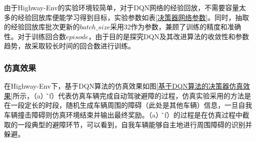 由于Highway-Env的实验环境较简单，对于DQN网络的经验回放，不需要容量太多的经验回放库便能学习得到目标，实验参数如表\ref{决策器网络参数}。同时，抽取的经验回放库批次更新的$batch\_size$采用32作为参数，兼顾了训练的精度和准确性。对于训练回合数$episode$，由于目的是探究DQN及其改进算法的收敛性和参数趋势，故采取较长时间的回合数进行训练。

\subsubsection{仿真效果}

在Highway-Env下，基于DQN算法的仿真效果如图\ref{基于DQN算法的决策器仿真效果}所示，（a）\~（f）代表仿真车辆完成自动驾驶避障的过程，仿真实验采用的方法是在一段定长的时段，随机生成车辆周围的障碍（此处是其他车辆）信息，一旦自我车辆撞击障碍则仿真环境结束并输出最终奖励。（a）\~（f）的过程是在仿真过程中截取的一段典型的避障环节，可以看到，自我车辆能够自主地进行周围障碍的识别并躲避。

